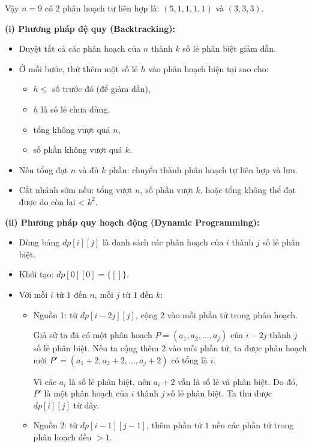 \documentclass{article}
\begin{document}
\begin{itemize}
    Vậy $n=9$ có 2 phân hoạch tự liên hợp là: $(5,1,1,1,1)$ và $(3,3,3)$.

    \textbf{(i) Phương pháp đệ quy (Backtracking):}
    \begin{itemize}
        \item Duyệt tất cả các phân hoạch của $n$ thành $k$ số lẻ phân biệt giảm dần.
        \item Ở mỗi bước, thử thêm một số lẻ $h$ vào phân hoạch hiện tại sao cho:
        \begin{itemize}
            \item $h \le$ số trước đó (để giảm dần),
            \item $h$ là số lẻ chưa dùng,
            \item tổng không vượt quá $n$,
            \item số phần không vượt quá $k$.
        \end{itemize}
        \item Nếu tổng đạt $n$ và đủ $k$ phần: chuyển thành phân hoạch tự liên hợp và lưu.
        \item Cắt nhánh sớm nếu: tổng vượt $n$, số phần vượt $k$, hoặc tổng không thể đạt được do còn lại < $k^2$.
    \end{itemize}
    
    \textbf{(ii) Phương pháp quy hoạch động (Dynamic Programming):}
    \begin{itemize}
        \item Dùng bảng $dp[i][j]$ là danh sách các phân hoạch của $i$ thành $j$ số lẻ phân biệt.
        \item Khởi tạo: $dp[0][0] = \{[]\}$.
        \item Với mỗi $i$ từ $1$ đến $n$, mỗi $j$ từ $1$ đến $k$:
        \begin{itemize}
            \item Nguồn 1: từ $dp[i - 2j][j]$, cộng 2 vào mỗi phần tử trong phân hoạch.
        
            Giả sử ta đã có một phân hoạch $P = (a_1, a_2, \dots, a_j)$ của $i - 2j$ thành $j$ số lẻ phân biệt. Nếu ta cộng thêm 2 vào mỗi phần tử, ta được phân hoạch mới $P' = (a_1+2, a_2+2, \dots, a_j+2)$ có tổng là $i$.
        
            Vì các $a_i$ là số lẻ phân biệt, nên $a_i + 2$ vẫn là số lẻ và phân biệt. Do đó, $P'$ là một phân hoạch của $i$ thành $j$ số lẻ phân biệt. Ta thu được $dp[i][j]$ từ đây.
        
            \item Nguồn 2: từ $dp[i - 1][j - 1]$, thêm phần tử $1$ nếu các phần tử trong phân hoạch đều $> 1$.
        

\end{itemize}
\end{itemize}
\end{itemize}
\end{document}
